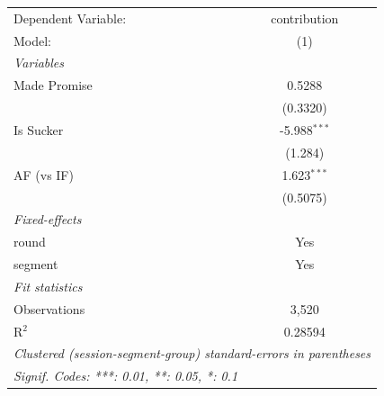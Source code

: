 
\begingroup
\centering
\begin{tabular}{lc}
   \tabularnewline \midrule \midrule
   Dependent Variable: & contribution\\  
   Model:              & (1)\\  
   \midrule
   \emph{Variables}\\
   Made Promise        & 0.5288\\   
                       & (0.3320)\\   
   Is Sucker           & -5.988$^{***}$\\   
                       & (1.284)\\   
   AF (vs IF)          & 1.623$^{***}$\\
                       & (0.5075)\\   
   \midrule
   \emph{Fixed-effects}\\
   round               & Yes\\  
   segment             & Yes\\  
   \midrule
   \emph{Fit statistics}\\
   Observations        & 3,520\\  
   R$^2$               & 0.28594\\  
   \midrule \midrule
   \multicolumn{2}{l}{\emph{Clustered (session-segment-group) standard-errors in parentheses}}\\
   \multicolumn{2}{l}{\emph{Signif. Codes: ***: 0.01, **: 0.05, *: 0.1}}\\
\end{tabular}
\par\endgroup


